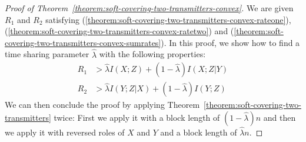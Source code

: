 \documentclass[journal]{IEEEtran}
\newcommand{\codebookRateOne}{R_1}
\newcommand{\codebookRateTwo}{R_2}
\newcommand{\channelInOne}{X}
\newcommand{\channelInTwo}{Y}
\newcommand{\channelOut}{Z}
\newcommand{\codebookBlocklength}{n}
\newcommand{\mutualInformation}[2]{I(#1;#2)}
\newcommand{\mutualInformationConditional}[3]{I(#1;#2|#3)}
\newcommand{\convexityParam}{\lambda}
\begin{document}
\begin{proof}[Proof of Theorem~\ref{theorem:soft-covering-two-transmitters-convex}]
We are given $\codebookRateOne$ and $\codebookRateTwo$ satisfying (\ref{theorem:soft-covering-two-transmitters-convex-rateone}), (\ref{theorem:soft-covering-two-transmitters-convex-ratetwo}) and (\ref{theorem:soft-covering-two-transmitters-convex-sumrates}). In this proof, we show how to find a time sharing parameter $\hat{\convexityParam}$ with the following properties:
\begin{align*}
\codebookRateOne
&>
\hat{\convexityParam} \mutualInformation{\channelInOne}{\channelOut}
+
(1-\hat{\convexityParam}) \mutualInformationConditional{\channelInOne}{\channelOut}{\channelInTwo}
\\
\codebookRateTwo
&>
\hat{\convexityParam} \mutualInformationConditional{\channelInTwo}{\channelOut}{\channelInOne}
+
(1-\hat{\convexityParam}) \mutualInformation{\channelInTwo}{\channelOut}
\end{align*}
We can then conclude the proof by applying Theorem~\ref{theorem:soft-covering-two-transmitters} twice: First we apply it with a block length of $(1-\hat{\convexityParam})\codebookBlocklength$ and then we apply it with reversed roles of $\channelInOne$ and $\channelInTwo$ and a block length of $\hat{\convexityParam}\codebookBlocklength$.


\end{proof}
\end{document}
